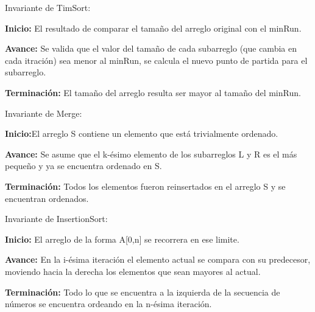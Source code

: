 \documentclass[a4paper]{article}
\theoremstyle{plain}
\theoremstyle{definition}
\begin{document}
    \begin{outline}[enumerate]
	Invariante de TimSort:
	
	    \1 \textbf{Inicio:} El resultado de comparar el tamaño del arreglo original con el minRun.
   
	    \1 \textbf{Avance:} Se valida que el valor del tamaño de cada subarreglo (que cambia en cada itración) sea menor al minRun, se calcula el nuevo punto de partida para el subarreglo.
	    
	    \1 \textbf{Terminación:} El tamaño del arreglo resulta ser mayor al tamaño del minRun.
	\end{outline}  
	\begin{outline}[enumerate]
	 Invariante de Merge:
	
	    \1 \textbf{Inicio:}El arreglo S contiene un elemento que está trivialmente ordenado.
   
	    \1 \textbf{Avance:} Se asume que el k-ésimo elemento de los subarreglos L y R es el más pequeño y ya se encuentra ordenado en S.
	    
	    \1 \textbf{Terminación:} Todos los elementos fueron reinsertados en el arreglo S y se encuentran ordenados.
	 \end{outline} 
	 \begin{outline}[enumerate]
	  Invariante de InsertionSort:
	
	    \1 \textbf{Inicio:} El arreglo de la forma A[0,n] se recorrera en ese limite.
   
	    \1 \textbf{Avance:} En la i-ésima iteración el elemento actual se compara con su predecesor, moviendo hacia la derecha los elementos que sean mayores al actual.
	    
	    \1 \textbf{Terminación:} Todo lo que se encuentra a la izquierda de la  secuencia de números se encuentra ordeando en la n-ésima iteración.
	  \end{outline}  
	
	
	
  

	
\end{document}
